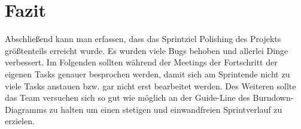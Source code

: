 \documentclass[12pt,a4paper, oneside]{article}
\begin{document}
    \section{Fazit}
    Abschließend kann man erfassen, dass das Sprintziel \glqq Polishing des Projekts \grqq{} größtenteils erreicht wurde. Es wurden viele Bugs behoben und allerlei Dinge verbessert. Im Folgenden sollten während der Meetings der Fortschritt der eigenen Tasks genauer besprochen werden, damit sich am Sprintende nicht zu viele Tasks anstauen bzw. gar nicht erst bearbeitet werden. Des Weiteren sollte das Team versuchen sich so gut wie möglich an der Guide-Line des Burndown-Diagramms zu halten um einen stetigen und einwandfreien Sprintverlauf zu erzielen.
\end{document}

